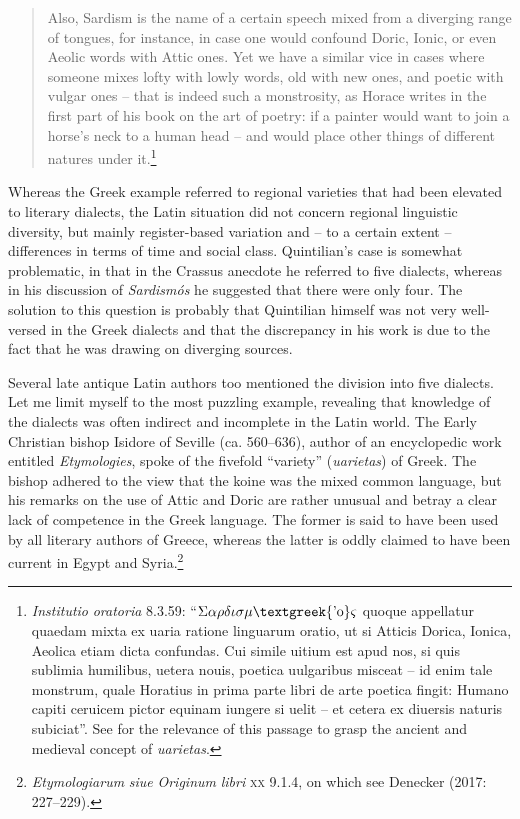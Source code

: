 \documentclass[output=paper]{langsci/langscibook}
\begin{document}
\begin{quote}
Also, Sardism is the name of a certain speech mixed from a diverging range of tongues, for instance, in case one would confound Doric, Ionic, or even Aeolic words with Attic ones. Yet we have a similar vice in cases where someone mixes lofty with lowly words, old with new ones, and poetic with vulgar ones – that is indeed such a monstrosity, as Horace writes in the first part of his book on the art of poetry: if a painter would want to join a horse’s neck to a human head – and would place other things of different natures under it.\footnote{\textrm{ \textit{Institutio} \textit{oratoria}} \textrm{8.3.59: “$\Sigma \alpha \rho \delta \iota \sigma \mu \text{\textgreek{'o}}\varsigma $ quoque appellatur quaedam mixta ex uaria ratione linguarum oratio, ut si Atticis Dorica, Ionica, Aeolica etiam dicta confundas. Cui simile uitium est apud nos, si quis sublimia humilibus, uetera nouis, poetica uulgaribus misceat – id enim tale monstrum, quale Horatius in prima parte libri de arte poetica fingit: Humano capiti ceruicem pictor equinam iungere si uelit – et cetera ex diuersis naturis subiciat”. See \citet[46]{Carruthers2009} for the relevance of this passage to grasp the ancient and medieval concept of} \textrm{\textit{uarietas}}.}
\end{quote}

Whereas the Greek example referred to regional varieties that had been elevated to literary dialects, the Latin situation did not concern regional linguistic diversity, but mainly register-based variation and – to a certain extent – differences in terms of time and social class. Quintilian’s case is somewhat problematic, in that in the Crassus anecdote he referred to five dialects, whereas in his discussion of \textit{Sardismós} he suggested that there were only four. The solution to this question is probably that Quintilian himself was not very well-versed in the Greek dialects and that the discrepancy in his work is due to the fact that he was drawing on diverging sources.

Several late antique Latin authors too mentioned the division into five dialects. Let me limit myself to the most puzzling example, revealing that knowledge of the dialects was often indirect and incomplete in the Latin world. The Early Christian bishop Isidore of Seville (ca. 560–636), author of an encyclopedic work entitled \textit{Etymologies}, spoke of the fivefold “variety” (\textit{uarietas}) of Greek. The bishop adhered to the view that the koine was the mixed common language, but his remarks on the use of Attic and Doric are rather unusual and betray a clear lack of competence in the Greek language. The former is said to have been used by all literary authors of Greece, whereas the latter is oddly claimed to have been current in Egypt and Syria.\footnote{\textit{Etymologiarum} \textit{siue} \textit{Originum} \textit{libri} \textsc{xx} 9.1.4, on which see Denecker (2017: 227–229).}
\end{document}
